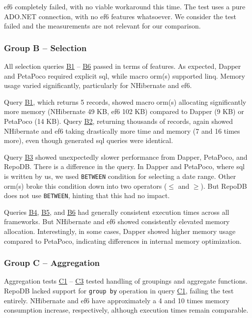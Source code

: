 \acrshort{ef}6 completely failed, with no viable workaround this time. The test uses a pure ADO.NET connection, with no \acrshort{ef}6 features whatsoever. We consider the test failed and the measurements are not relevant for our comparison.

\subsubsection{Group B -- Selection}
All selection queries \hyperref[query:b1]{B1} -- \hyperref[query:b6]{B6} passed in terms of features. As expected, Dapper and PetaPoco required explicit \acrshort{sql}, while macro \acrshort{orm}(s) supported \acrshort{linq}. Memory usage varied significantly, particularly for NHibernate and \acrshort{ef}6.

Query \hyperref[query:b1]{B1}, which returns 5 records, showed macro \acrshort{orm}(s) allocating significantly more memory (NHibernate 49 KB, \acrshort{ef}6 102 KB) compared to Dapper (9 KB) or PetaPoco (14 KB). Query \hyperref[query:b2]{B2}, returning thousands of records, again showed NHibernate and \acrshort{ef}6 taking drastically more time and memory (7 and 16 times more), even though generated \acrshort{sql} queries were identical.

Query \hyperref[query:b3]{B3} showed unexpectedly slower performance from Dapper, PetaPoco, and RepoDB. There is a difference in the query. In Dapper and PetaPoco, where \acrshort{sql} is written by us, we used \texttt{BETWEEN} condition for selecting a date range. Other \acrshort{orm}(s) broke this condition down into two operators ($\leq$ and $\geq$). But RepoDB does not use \texttt{BETWEEN}, hinting that this had no impact.

Queries \hyperref[query:b4]{B4}, \hyperref[query:b5]{B5}, and \hyperref[query:b6]{B6} had generally consistent execution times across all frameworks. But NHibernate and \acrshort{ef}6 showed consistently elevated memory allocation. Interestingly, in some cases, Dapper showed higher memory usage compared to PetaPoco, indicating differences in internal memory optimization. 

\subsubsection{Group C -- Aggregation}
Aggregation tests \hyperref[query:c1]{C1} -- \hyperref[query:c3]{C3} tested handling of groupings and aggregate functions. RepoDB lacked support for \texttt{group by} operation in query \hyperref[query:c1]{C1}, failing the test entirely. NHibernate and \acrshort{ef}6 have approximately a 4 and 10 times memory consumption increase, respectively, although execution times remain comparable. 

